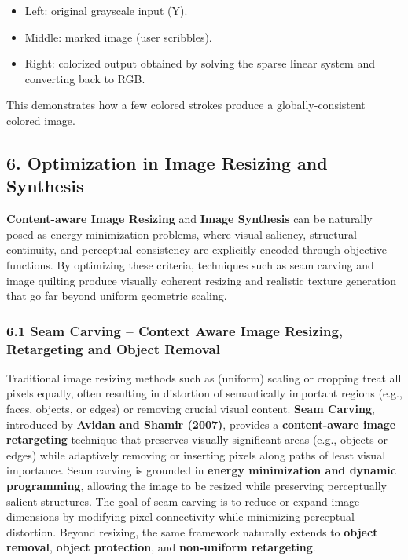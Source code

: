 \documentclass[11pt]{article}
\providecommand{\tightlist}{%
      \setlength{\itemsep}{0pt}\setlength{\parskip}{0pt}}
\begin{document}
\begin{itemize}
\tightlist
\item
  Left: original grayscale input (Y).
\item
  Middle: marked image (user scribbles).
\item
  Right: colorized output obtained by solving the sparse linear system
  and converting back to RGB.
\end{itemize}

This demonstrates how a few colored strokes produce a
globally-consistent colored image.

    \hypertarget{optimization-in-image-resizing-and-synthesis}{%
\subsection{\texorpdfstring{\textbf{6. Optimization in Image Resizing
and
Synthesis}}{6. Optimization in Image Resizing and Synthesis}}\label{optimization-in-image-resizing-and-synthesis}}

\textbf{Content-aware Image Resizing} and \textbf{Image Synthesis} can
be naturally posed as energy minimization problems, where visual
saliency, structural continuity, and perceptual consistency are
explicitly encoded through objective functions. By optimizing these
criteria, techniques such as seam carving and image quilting produce
visually coherent resizing and realistic texture generation that go far
beyond uniform geometric scaling.

\hypertarget{seam-carving-context-aware-image-resizing-retargeting-and-object-removal}{%
\subsubsection{\texorpdfstring{\textbf{6.1 Seam Carving -- Context Aware
Image Resizing, Retargeting and Object
Removal}}{6.1 Seam Carving -- Context Aware Image Resizing, Retargeting and Object Removal}}\label{seam-carving-context-aware-image-resizing-retargeting-and-object-removal}}

Traditional image resizing methods such as (uniform) scaling or cropping
treat all pixels equally, often resulting in distortion of semantically
important regions (e.g., faces, objects, or edges) or removing crucial
visual content. \textbf{Seam Carving}, introduced by \textbf{Avidan and
Shamir (2007)}, provides a \textbf{content-aware image retargeting}
technique that preserves visually significant areas (e.g., objects or
edges) while adaptively removing or inserting pixels along paths of
least visual importance. Seam carving is grounded in \textbf{energy
minimization and dynamic programming}, allowing the image to be resized
while preserving perceptually salient structures. The goal of seam
carving is to reduce or expand image dimensions by modifying pixel
connectivity while minimizing perceptual distortion. Beyond resizing,
the same framework naturally extends to \textbf{object removal},
\textbf{object protection}, and \textbf{non-uniform retargeting}.
\end{document}
